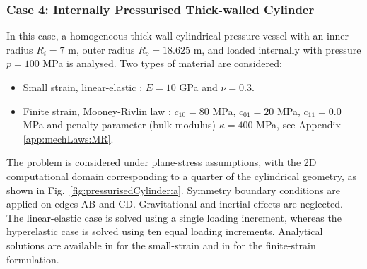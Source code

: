 \documentclass[sn-mathphys,Numbered]{sn-jnl}%
\begin{document}
\subsubsection{Case 4: Internally Pressurised Thick-walled Cylinder}
%
In this case, a homogeneous thick-wall cylindrical pressure vessel with an inner radius $R_i = 7$ m, outer radius $R_o = 18.625$ m, and loaded internally with pressure $p = 100$ MPa is analysed. Two types of material are considered:
\begin{itemize}
\item[i.] Small strain, linear-elastic \cite{Bijelonja2006}: $E=10$ GPa and $\nu=0.3$.
\item[ii.] Finite strain, Mooney-Rivlin law \cite{Bijelonja2005a}: $c_{10} = 80$ MPa, $c_{01} = 20$ MPa, $c_{11} = 0.0$ MPa and penalty parameter (bulk modulus) $\kappa=400$ MPa, see Appendix \ref{app:mechLaws:MR}.
\end{itemize}
The problem is considered under plane-stress assumptions, with the 2D computational domain corresponding to a quarter of the cylindrical geometry, as shown in Fig.~\ref{fig:pressurisedCylinder:a}. Symmetry boundary conditions are applied on edges AB and CD. Gravitational and inertial effects are neglected. The linear-elastic case is solved using a single loading increment, whereas the hyperelastic case is solved using ten equal loading increments. Analytical solutions are available in \cite{Timoshenko1970} for the small-strain and in \cite{Green1992} for the finite-strain formulation.
\end{document}
